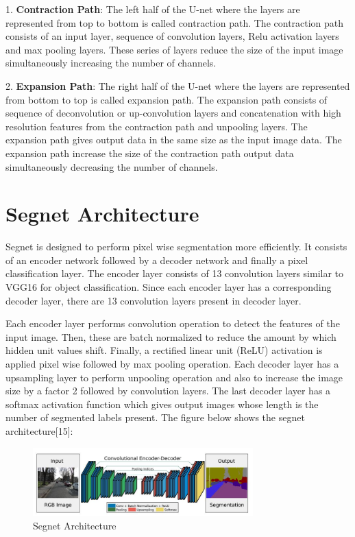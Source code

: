 \documentclass{IEEEtran}
\begin{document}
1. \textbf{Contraction Path}: The left half of the U-net where the layers are represented from top to bottom is called contraction path. The contraction path consists of an input layer, sequence of convolution layers, Relu activation layers and max pooling layers. These series of layers reduce the size of the input image simultaneously increasing the number of channels.


2. \textbf{Expansion Path}: The right half of the U-net where the layers are represented from bottom to top is called expansion path. The expansion path consists of sequence of deconvolution or up-convolution layers and concatenation with high resolution features from the contraction path and unpooling layers. The expansion path gives output data in the same size as the input image data. The expansion path increase the size of the contraction path output data simultaneously decreasing the number of channels.

\section{\textbf{Segnet Architecture}}
Segnet is designed to perform pixel wise segmentation more efficiently. It consists of an encoder network followed by a decoder network and finally a pixel classification layer. The encoder layer consists of 13 convolution layers similar to VGG16 for object classification. Since each encoder layer has a corresponding decoder layer, there are 13 convolution layers present in decoder layer.

Each encoder layer performs convolution operation to detect the features of the input image. Then, these are batch normalized to reduce the amount by which hidden unit values shift. Finally, a rectified linear unit (ReLU) activation is applied pixel wise followed by max pooling operation. Each decoder layer has a upsampling layer to perform unpooling operation and also to increase the image size by a factor 2 followed by convolution layers. The last decoder layer has a softmax activation function which gives output images whose length is the number of segmented labels present. The figure below shows the segnet architecture[15]:

\begin{figure}[h]
    \centering
    \captionsetup{justification=centering}
    \includegraphics[width=8.5cm]{segnet}
    \caption{Segnet Architecture}
    \label{fig:Binary class segmented output}
\end{figure}
\end{document}
